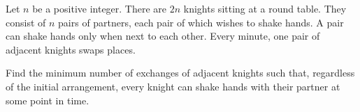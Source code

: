 Let $n$ be a positive integer. There are $2n$ knights sitting at a round table. They consist of $n$ pairs of partners, each pair of which wishes to shake hands. A pair can shake hands only when next to each other. Every minute, one pair of adjacent knights swaps places.

Find the minimum number of exchanges of adjacent knights such that, regardless of the initial arrangement, every knight can shake hands with their partner at some point in time.
